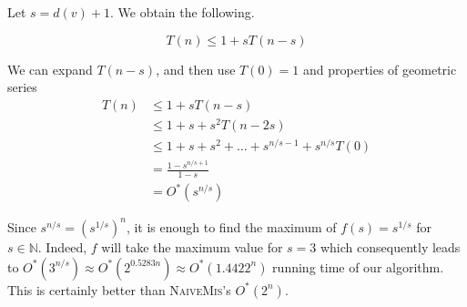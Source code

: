 Let $s = d(v) + 1$. We obtain the following.

$$
T(n) \leq 1 + s T(n - s)
$$

We can expand $T(n-s)$, and then use $T(0)=1$ and properties of geometric series
\begin{equation*}
\begin{split}
T(n) & \leq 1 + s T(n - s) \\
 & \leq 1 + s + s^2T(n - 2s) \\
 & \leq 1 + s + s^2 + \ldots + s^{n/s - 1} + s^{n/s} T(0) \\
 & = \frac{1-s^{n/s+1}}{1-s} \\
 & = O^*\left(s^{n/s}\right)
\end{split}
\end{equation*}

Since $s^{n/s} = (s^{1/s})^n$, it is enough to find the maximum of $f(s) = s^{1/s}$ for $s \in \mathbb{N}$. Indeed, $f$ will take the maximum value for $s=3$ which consequently leads to $O^*(3^{n/s}) \approx O^*(2^{0.5283n}) \approx O^*(1.4422^n)$ running time of our algorithm. This is certainly better than \textsc{NaiveMis}'s $O^*(2^n)$.